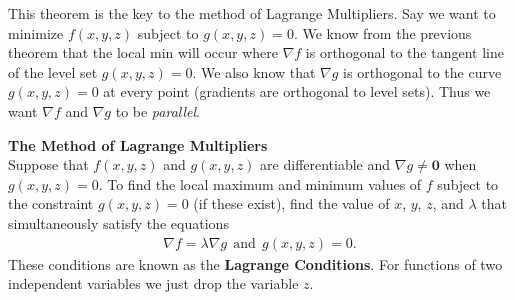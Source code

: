\documentclass[12pt, letter]{article}
\theoremstyle{plain}
\numberwithin{theorem}{section}
\theoremstyle{definition}
\begin{document}
\bigskip

\hrulefill

\bigskip

This theorem is the key to the method of Lagrange Multipliers. Say we want to minimize $f(x,y,z)$ subject to $g(x,y,z) = 0$. We know from the previous theorem that the local min will occur where $\nabla f$ is orthogonal to the tangent line of the level set $g(x,y,z) = 0$. We also know that $\nabla g$ is orthogonal to the curve $g(x,y,z)=0$ at every point (gradients are orthogonal to level sets). Thus we want $\nabla f$ and $\nabla g$ to be \textit{parallel}.

\bigskip

\hrulefill

\newpage

\textbf{The Method of Lagrange Multipliers}\\
Suppose that $f(x,y,z)$ and $g(x,y,z)$ are differentiable and $\nabla g \neq \bm{0}$ when $g(x,y,z) = 0$. To find the local maximum and minimum values of $f$ subject to the constraint $g(x,y,z) = 0$ (if these exist), find the value of $x$, $y$, $z$, and $\lambda$ that simultaneously satisfy the equations
\begin{align*}
\nabla f = \lambda \nabla g \ \ \text{and} \ \ g(x,y,z) = 0.
\end{align*}
These conditions are known as the \textbf{Lagrange Conditions}. For functions of two independent variables we just drop the variable $z$.

\bigskip

\hrulefill

\bigskip
\end{document}
